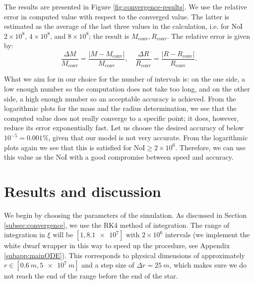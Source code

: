 \documentclass[]{article}
\begin{document}
	The results are presented in Figure \ref{fig:convergence-results}. We use the relative error in computed value with respect to the converged value. The latter is estimated as the average of the last three values in the calculation, i.e. for NoI $2 \times 10^8$, $4 \times 10^8$, and $8 \times 10^8$; the result is $M_\textrm{conv}, R_\textrm{conv}$. The relative error is given by:
	\begin{equation}
		\frac{\Delta M}{M_\mathrm{conv}} = \frac{\left| M - M_\mathrm{conv}\right|}{M_\mathrm{conv}}, \quad \frac{\Delta R}{R_\mathrm{conv}} = \frac{\left| R - R_\mathrm{conv}\right|}{R_\mathrm{conv}}.
	\end{equation}
	
	What we aim for in our choice for the number of intervals is: on the one side, a low enough number so the computation does not take too long, and on the other side, a high enough number so an acceptable accuracy is achieved. From the logarithmic plots for the mass and the radius determination, we see that the computed value does not really converge to a specific point; it does, however, reduce its error exponentially fast. Let us choose the desired accuracy of below $10^{-5} = 0.001 \%$, given that our model is not very accurate. From the logarithmic plots again we see that this is satisfied for $\text{NoI} \geq 2 \times 10^6$. Therefore, we can use this value as the NoI with a good compromise between speed and accuracy.

\section{Results and discussion}\label{sec:results-and-discussion}
	We begin by choosing the parameters of the simulation. As discussed in Section \ref{subsec:convergence}, we use the RK4 method of integration. The range of integration in $\xi$ will be $\left[ 1, \num{8.1e7}\right]$ with $2 \times 10^6$ intervals (we implement the white dwarf wrapper in this way to speed up the procedure, see Appendix \ref{subapp:mainODE}). This corresponds to physical dimensions of approximately $r \in \left[\SI{0.6}{m}, \SI{5e7}{m}\right]$ and a step size of $\Delta r = \SI{25}{m}$, which makes sure we do not reach the end of the range before the end of the star.
\end{document}
